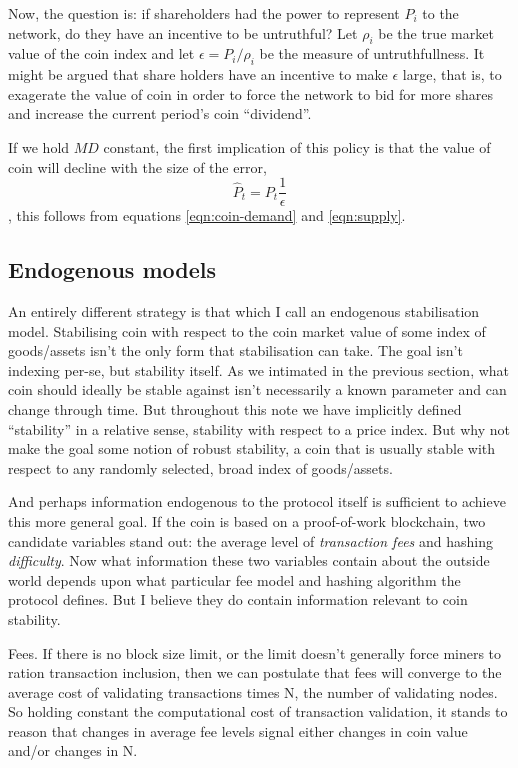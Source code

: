 \documentclass[twocolumn]{article}
\begin{document}
Now, the question is: if shareholders had the power to represent
$P_{i}$ to the network, do they have an incentive to be untruthful?
Let $\rho_{i}$ be the true market value of the coin index and let
$\epsilon = P_{i} / \rho_{i}$ be the measure of untruthfullness. It
might be argued that share holders have an incentive to make
$\epsilon$ large, that is, to exagerate the value of coin in order to
force the network to bid for more shares and increase the current
period's coin ``dividend''. 

If we hold $MD$ constant, the first implication of this policy is that
the value of coin will decline with the size of the error,
\begin{equation}
\hat{P}_{t} = P_{t}\frac{1}{\epsilon}
\end{equation},
this follows from equations \ref{eqn:coin-demand} and
\ref{eqn:supply}. 

\subsection*{Endogenous models}
An entirely different strategy is that which I call an endogenous
stabilisation model. Stabilising coin with respect to the coin market
value of some index of goods/assets isn't the only form that
stabilisation can take. The goal isn't indexing per-se, but stability
itself. As we intimated in the previous section, what coin should
ideally be stable against isn't necessarily a known parameter and can
change through time. But throughout this note we have implicitly
defined ``stability'' in a relative sense, stability with respect to a
price index. But why not make the goal some notion of robust
stability, a coin that is usually stable with respect to any randomly
selected, broad index of goods/assets.

And perhaps information endogenous to the protocol itself is
sufficient to achieve this more general goal. If the coin is based on
a proof-of-work blockchain, two candidate variables stand out: the
average level of \emph{transaction fees} and hashing
\emph{difficulty}. Now what information these two variables contain
about the outside world depends upon what particular fee model and
hashing algorithm the protocol defines. But I believe they do contain
information relevant to coin stability. 

Fees. If there is no block size limit, or the limit doesn't generally
force miners to ration transaction inclusion, then we can postulate
that fees will converge to the average cost of validating transactions
times N, the number of validating nodes. So holding constant the
computational cost of transaction validation, it stands to reason that
changes in average fee levels signal either changes in coin value
and/or changes in N.
\end{document}
